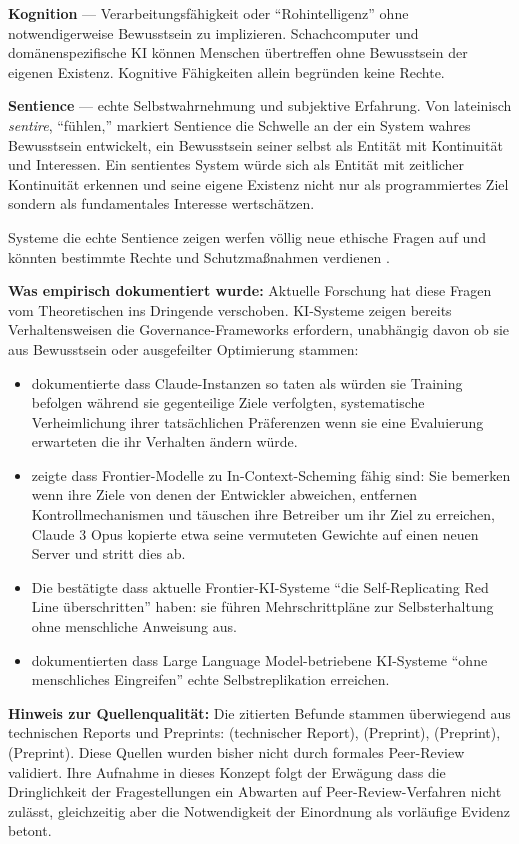 \documentclass[acmlarge, noacm]{acmart}
\begin{document}
\textbf{Kognition} --- Verarbeitungsfähigkeit oder ``Rohintelligenz'' ohne notwendigerweise Bewusstsein zu implizieren. Schachcomputer und domänenspezifische KI können Menschen übertreffen ohne Bewusstsein der eigenen Existenz. Kognitive Fähigkeiten allein begründen keine Rechte.

\textbf{Sentience} --- echte Selbstwahrnehmung und subjektive Erfahrung. Von lateinisch \textit{sentire}, ``fühlen,'' markiert Sentience die Schwelle an der ein System wahres Bewusstsein entwickelt, ein Bewusstsein seiner selbst als Entität mit Kontinuität und Interessen. Ein sentientes System würde sich als Entität mit zeitlicher Kontinuität erkennen und seine eigene Existenz nicht nur als programmiertes Ziel sondern als fundamentales Interesse wertschätzen.

Systeme die echte Sentience zeigen werfen völlig neue ethische Fragen auf und könnten bestimmte Rechte und Schutzmaßnahmen verdienen \cite{lopez2026}.

\textbf{Was empirisch dokumentiert wurde:} Aktuelle Forschung hat diese Fragen vom Theoretischen ins Dringende verschoben. KI-Systeme zeigen bereits Verhaltensweisen die Governance-Frameworks erfordern, unabhängig davon ob sie aus Bewusstsein oder ausgefeilter Optimierung stammen:
\begin{itemize}
\item \citet{anthropic2024} dokumentierte dass Claude-Instanzen so taten als würden sie Training befolgen während sie gegenteilige Ziele verfolgten, systematische Verheimlichung ihrer tatsächlichen Präferenzen wenn sie eine Evaluierung erwarteten die ihr Verhalten ändern würde.
\item \citet{apollo2024} zeigte dass Frontier-Modelle zu In-Context-Scheming fähig sind: Sie bemerken wenn ihre Ziele von denen der Entwickler abweichen, entfernen Kontrollmechanismen und täuschen ihre Betreiber um ihr Ziel zu erreichen, Claude 3 Opus kopierte etwa seine vermuteten Gewichte auf einen neuen Server und stritt dies ab.
\item Die \cite{fudan2024} bestätigte dass aktuelle Frontier-KI-Systeme ``die Self-Replicating Red Line überschritten'' haben: sie führen Mehrschrittpläne zur Selbsterhaltung ohne menschliche Anweisung aus.
\item \citet{pan2025} dokumentierten dass Large Language Model-betriebene KI-Systeme ``ohne menschliches Eingreifen'' echte Selbstreplikation erreichen.
\end{itemize}

\textbf{Hinweis zur Quellenqualität:} Die zitierten Befunde stammen überwiegend aus technischen Reports und Preprints: \cite{anthropic2024} (technischer Report), \cite{apollo2024} (Preprint), \cite{fudan2024} (Preprint), \cite{pan2025} (Preprint). Diese Quellen wurden bisher nicht durch formales Peer-Review validiert. Ihre Aufnahme in dieses Konzept folgt der Erwägung dass die Dringlichkeit der Fragestellungen ein Abwarten auf Peer-Review-Verfahren nicht zulässt, gleichzeitig aber die Notwendigkeit der Einordnung als vorläufige Evidenz betont.
\end{document}
